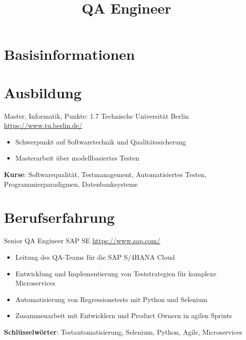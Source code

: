 \documentclass[a4paper, serif, 10pt]{moderncv}
\title{QA Engineer}
\begin{document}
\maketitle

\section{Basisinformationen}

\section{Ausbildung}

        {Master, Informatik, Punkte: 1.7}
        {Technische Universität Berlin}
        {\url{https://www.tu.berlin.de/}}
        {}
        {\begin{itemize}
\item Schwerpunkt auf Softwaretechnik und Qualitätssicherung
\item Masterarbeit über modellbasiertes Testen
\end{itemize}
\textbf{Kurse}: Softwarequalität, Testmanagement, Automatisiertes Testen, Programmierparadigmen, Datenbanksysteme}
\section{Berufserfahrung}

        {Senior QA Engineer}
        {SAP SE}
        {\url{https://www.sap.com/}}
        {}
        {\begin{itemize}
\item Leitung des QA-Teams für die SAP S/4HANA Cloud
\item Entwicklung und Implementierung von Teststrategien für komplexe Microservices
\item Automatisierung von Regressionstests mit Python und Selenium
\item Zusammenarbeit mit Entwicklern und Product Ownern in agilen Sprints
\end{itemize}
\textbf{Schlüsselwörter}: Testautomatisierung, Selenium, Python, Agile, Microservices}
\end{document}
